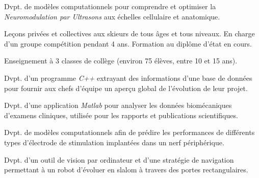 \documentclass[a4paper]{cv}
\begin{document}
\begin{minipage}[t]{0.6\textwidth}

\experience

Dvpt. de modèles computationnels pour comprendre et optimiser la \emph{Neuromodulation par Ultrasons} aux échelles cellulaire et anatomique.
\sectionspace

Leçons privées et collectives aux skieurs de tous âges et tous niveaux. En charge d'un groupe compétition pendant 4 ans. Formation au diplôme d’état en cours.
\sectionspace

Enseignement à 3 classes de collège (environ 75 élèves, entre 10 et 15 ans).
\sectionspace

Dvpt. d'un programme \emph{C++} extrayant des informations d'une base de données pour fournir aux chefs d’équipe un aperçu global de l'évolution de leur projet.
\sectionspace

Dvpt. d'une application \emph{Matlab} pour analyser les données biomécaniques d’examens cliniques, utilisée pour les rapports et publications scientifiques.
\sectionspace

\projects

Dvpt. de modèles computationnels afin de prédire les performances de différents types d'électrode de stimulation implantées dans un nerf périphérique.
\sectionspace

Dvpt. d'un outil de vision par ordinateur et d'une stratégie de navigation permettant à un robot d'évoluer en slalom à travers des portes rectangulaires.
\sectionspace


\end{minipage}
\end{document}

